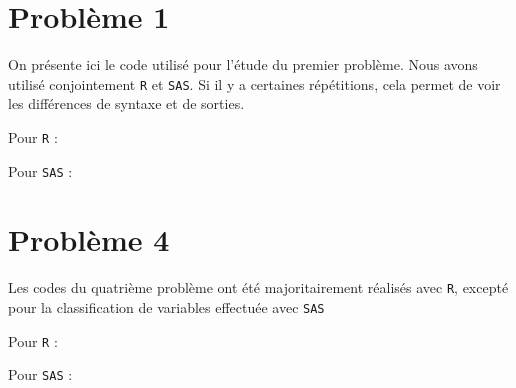 \documentclass[a4paper]{report}
\begin{document}
 \begin{appendix}
 \chapter{Problème 1}
  \label{Pb1}
 On présente ici le code utilisé pour l'étude du premier problème. Nous avons utilisé conjointement \verb|R| et \verb|SAS|. Si il y a certaines répétitions, cela permet de voir les différences de syntaxe et de sorties.
 
 Pour \verb|R| : 
\lstset{frame=single, xrightmargin =1cm , xleftmargin =1 cm}


Pour \verb|SAS| : 


 \chapter{Problème 4}
 Les codes du quatrième problème ont été majoritairement réalisés avec \verb|R|, excepté pour la classification de variables effectuée avec \verb|SAS|
 
 Pour \verb|R| : 
  

Pour \verb|SAS| : 


\end{appendix}
\end{document}
